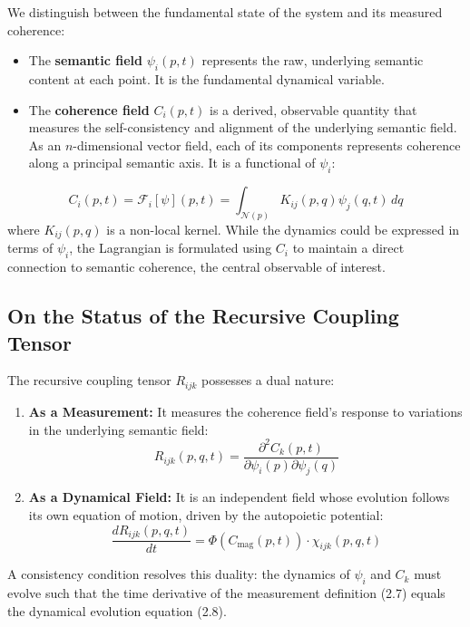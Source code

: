 We distinguish between the fundamental state of the system and its measured coherence:
\begin{itemize}
    \item The \textbf{semantic field} \(\psi_i(p,t)\) represents the raw, underlying semantic content at each point. It is the fundamental dynamical variable.
    \item The \textbf{coherence field} \(C_i(p,t)\) is a derived, observable quantity that measures the self-consistency and alignment of the underlying semantic field. As an \(n\)-dimensional vector field, each of its components represents coherence along a principal semantic axis. It is a functional of \(\psi_i\):
\end{itemize}
\begin{equation}
C_i(p,t) = \mathcal{F}_i[\psi](p,t) = \int_{\mathcal{N}(p)} K_{ij}(p,q) \psi_j(q,t) \, dq
\end{equation}
where \(K_{ij}(p,q)\) is a non-local kernel. While the dynamics could be expressed in terms of \(\psi_i\), the Lagrangian is formulated using \(C_i\) to maintain a direct connection to semantic coherence, the central observable of interest.

\subsection{On the Status of the Recursive Coupling Tensor}\label{sec:on_the_status_of_the_recursive_coupling_tensor}

The recursive coupling tensor \(R_{ijk}\) possesses a dual nature:
\begin{enumerate}
    \item \textbf{As a Measurement:} It measures the coherence field's response to variations in the underlying semantic field:
    \begin{equation}
    R_{ijk}(p, q, t) = \frac{\partial^2 C_k(p,t)}{\partial \psi_i(p) \partial \psi_j(q)}
    \end{equation}
    \item \textbf{As a Dynamical Field:} It is an independent field whose evolution follows its own equation of motion, driven by the autopoietic potential:
    \begin{equation}
    \frac{dR_{ijk}(p,q,t)}{dt} = \Phi(C_{\mathrm{mag}}(p,t)) \cdot \chi_{ijk}(p,q,t)
    \end{equation}
\end{enumerate}
A consistency condition resolves this duality: the dynamics of \(\psi_i\) and \(C_k\) must evolve such that the time derivative of the measurement definition (2.7) equals the dynamical evolution equation (2.8).

